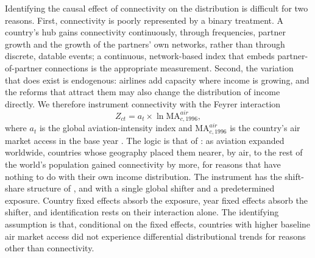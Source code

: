 Identifying the causal effect of connectivity on the distribution is difficult for two reasons. First, connectivity is poorly represented by a binary treatment. A country's hub gains connectivity continuously, through frequencies, partner growth and the growth of the partners' own networks, rather than through discrete, datable events; a continuous, network-based index that embeds partner-of-partner connections is the appropriate measurement. Second, the variation that does exist is endogenous: airlines add capacity where income is growing, and the reforms that attract them may also change the distribution of income directly. We therefore instrument connectivity with the Feyrer interaction
\begin{equation}
Z_{ct} = a_t \times \ln\mathrm{MA}^{air}_{c,1996},
\label{eq:iv}
\end{equation}
where $a_t$ is the global aviation-intensity index and $\mathrm{MA}^{air}_{c,1996}$ is the country's air market access in the base year \citep{Feyrer_2019}. The logic is that of \citet{Feyrer_2019}: as aviation expanded worldwide, countries whose geography placed them nearer, by air, to the rest of the world's population gained connectivity by more, for reasons that have nothing to do with their own income distribution. The instrument has the shift-share structure of \citet{GoldsmithPinkham_2020}, \citet{Adao_2019} and \citet{Borusyak_2022} with a single global shifter and a predetermined exposure. Country fixed effects absorb the exposure, year fixed effects absorb the shifter, and identification rests on their interaction alone. The identifying assumption is that, conditional on the fixed effects, countries with higher baseline air market access did not experience differential distributional trends for reasons other than connectivity.

